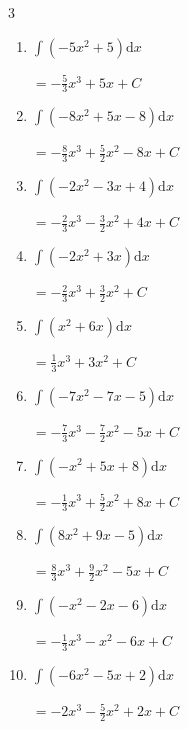 \begin{multicols}{3}
\begin{enumerate}
  \item $\displaystyle \int \left( -5x^{2}+5 \right) \mathrm{d}x$

        $\displaystyle =-\frac{5}{3}x^{3}+5x+ C$

  \item $\displaystyle \int \left( -8x^{2}+5x-8 \right) \mathrm{d}x$

        $\displaystyle =-\frac{8}{3}x^{3}+\frac{5}{2}x^{2}-8x+ C$

  \item $\displaystyle \int \left( -2x^{2}-3x+4 \right) \mathrm{d}x$

        $\displaystyle =-\frac{2}{3}x^{3}-\frac{3}{2}x^{2}+4x+ C$

  \item $\displaystyle \int \left( -2x^{2}+3x \right) \mathrm{d}x$

        $\displaystyle =-\frac{2}{3}x^{3}+\frac{3}{2}x^{2}+ C$

  \item $\displaystyle \int \left( x^{2}+6x \right) \mathrm{d}x$

        $\displaystyle =\frac{1}{3}x^{3}+3x^{2}+ C$

  \item $\displaystyle \int \left( -7x^{2}-7x-5 \right) \mathrm{d}x$

        $\displaystyle =-\frac{7}{3}x^{3}-\frac{7}{2}x^{2}-5x+ C$

  \item $\displaystyle \int \left( -x^{2}+5x+8 \right) \mathrm{d}x$

        $\displaystyle =-\frac{1}{3}x^{3}+\frac{5}{2}x^{2}+8x+ C$

  \item $\displaystyle \int \left( 8x^{2}+9x-5 \right) \mathrm{d}x$

        $\displaystyle =\frac{8}{3}x^{3}+\frac{9}{2}x^{2}-5x+ C$

\columnbreak %

\resetques

  \item $\displaystyle \int \left( -x^{2}-2x-6 \right) \mathrm{d}x$

        $\displaystyle =-\frac{1}{3}x^{3}-x^{2}-6x+ C$

  \item $\displaystyle \int \left( -6x^{2}-5x+2 \right) \mathrm{d}x$

        $\displaystyle =-2x^{3}-\frac{5}{2}x^{2}+2x+ C$


\end{enumerate}
\end{multicols}
